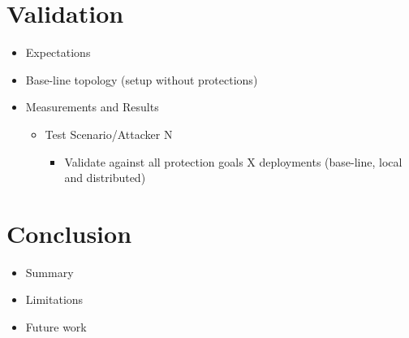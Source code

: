 \documentclass{article}
\begin{document}
\section{Validation}
\begin{itemize}
    \item Expectations
    \item Base-line topology (setup without protections)
    \item Measurements and Results
    \begin{itemize}
        \item Test Scenario/Attacker N
        \begin{itemize}
            \item Validate against all protection goals X deployments (base-line, local and distributed)
        \end{itemize}
    \end{itemize}
\end{itemize}

\section{Conclusion}
\begin{itemize}
    \item Summary
    \item Limitations
    \item Future work
\end{itemize}

\printbibliography
\end{document}
